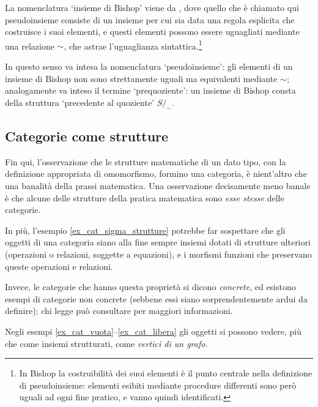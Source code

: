 \begin{terminology}
	La nomenclatura `insieme di Bishop' viene da \cite{Bishop1985}, dove quello che è chiamato qui pseudoinsieme consiste di un insieme per cui sia data una regola esplicita che costruisce i suoi elementi, e questi elementi possono essere uguagliati mediante una relazione \(\sim\), che astrae l'uguaglianza sintattica.\footnote{In Bishop la costruibilità dei suoi elementi è il punto centrale nella definizione di pseudoinsieme: elementi esibiti mediante procedure differenti sono però uguali ad ogni fine pratico, e vanno quindi identificati.}

	In questo senso va intesa la nomenclatura `pseudoinsieme': gli elementi di un insieme di Bishop non sono strettamente uguali ma equivalenti mediante \(\sim\); analogamente va inteso il termine `prequoziente': un insieme di Bishop consta della struttura `precedente al quoziente' \(S/_\sim\).
\end{terminology}
\subsection{Categorie come strutture}\label{ssec:categorie_strutture}
Fin qui, l'osservazione che le strutture matematiche di un dato tipo, con la definizione appropriata di omomorfismo, formino una categoria, è nient'altro che una banalità della prassi matematica. Una osservazione decisamente meno banale è che alcune delle strutture della pratica matematica sono \emph{esse stesse} delle categorie.

In più, l'esempio \ref{ex_cat_sigma_strutture} potrebbe far sospettare che gli oggetti di una categoria siano alla fine sempre insiemi dotati di strutture ulteriori (operazioni o relazioni, soggette a equazioni), e i morfismi funzioni che preservano queste operazioni e relazioni.

Invece, le categorie che hanno questa proprietà si dicono \emph{concrete}, ed esistono esempi di categorie non concrete (sebbene essi siano sorprendentemente ardui da definire); chi legge può consultare \cite{Freyd1973,Kuera1971} per maggiori informazioni.

Negli esempi \ref{ex_cat_vuota}--\ref{ex_cat_libera} gli oggetti si possono vedere, più che come insiemi strutturati, come \emph{vertici di un grafo}.

